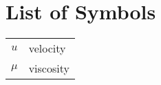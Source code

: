 \chapter*{List of Symbols}

\begin{tabular}{cp{}}

$u$ & velocity \\ 
$\mu$ & viscosity \\ 

\end{tabular}\\
